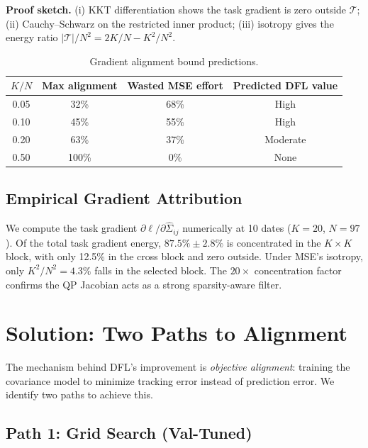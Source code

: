 \documentclass[11pt]{article}
\newcommand{\bSigma}{\hat{\Sigma}}
\begin{document}
\textbf{Proof sketch.} (i) KKT differentiation shows the task gradient is zero outside $\mathcal{T}$; (ii) Cauchy--Schwarz on the restricted inner product; (iii) isotropy gives the energy ratio $|\mathcal{T}|/N^2 = 2K/N - K^2/N^2$.

\begin{table}[h]
\centering
\caption{Gradient alignment bound predictions.}
\label{tab:bound}
\small
\begin{tabular}{@{}cccc@{}}
\toprule
$K/N$ & Max alignment & Wasted MSE effort & Predicted DFL value \\
\midrule
0.05 & 32\% & 68\% & High \\
0.10 & 45\% & 55\% & High \\
0.20 & 63\% & 37\% & Moderate \\
0.50 & 100\% & 0\% & None \\
\bottomrule
\end{tabular}
\end{table}

\subsection{Empirical Gradient Attribution}

We compute the task gradient $\partial \ell / \partial \bSigma_{ij}$ numerically at 10 dates ($K{=}20$, $N{=}97$). Of the total task gradient energy, $87.5\% \pm 2.8\%$ is concentrated in the $K \times K$ block, with only 12.5\% in the cross block and zero outside. Under MSE's isotropy, only $K^2/N^2 = 4.3\%$ falls in the selected block. The $20\times$ concentration factor confirms the QP Jacobian acts as a strong sparsity-aware filter.

\section{Solution: Two Paths to Alignment}
\label{sec:method}

The mechanism behind DFL's improvement is \emph{objective alignment}: training the covariance model to minimize tracking error instead of prediction error. We identify two paths to achieve this.

\subsection{Path 1: Grid Search (Val-Tuned)}
\end{document}
